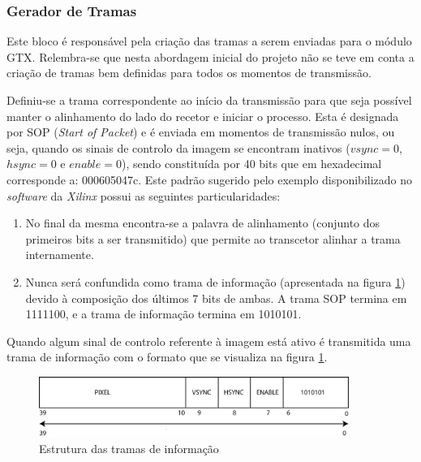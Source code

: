 \documentclass[11pt,a4paper]{article}
\begin{document}
	\subsubsection*{Gerador de Tramas} \label{subsub:serial_frameGenerator}
	
	Este bloco é responsável pela criação das tramas a serem enviadas para o módulo GTX. Relembra-se que nesta abordagem inicial do projeto não se teve em conta a criação de tramas bem definidas para todos os momentos de transmissão. 
	
	Definiu-se a trama correspondente ao início da transmissão para que seja possível manter o alinhamento do lado do recetor e iniciar o processo. Esta é designada por  SOP (\textit{Start of Packet}) e é enviada em momentos de transmissão nulos, ou seja, quando os sinais de controlo da imagem se encontram inativos ($vsync = 0$, $hsync = 0$ e $enable = 0$), sendo constituída por 40 bits que em hexadecimal corresponde a: 000605047c. Este padrão sugerido pelo exemplo disponibilizado no \textit{software} da \textit{Xilinx} possui as seguintes particularidades:
	
	\begin{enumerate}
		\item No final da mesma encontra-se a palavra de alinhamento (conjunto dos primeiros bits a ser transmitido) que permite ao transcetor alinhar a trama internamente.
		\item Nunca será confundida como trama de informação (apresentada na figura \ref{fig:trama_abordagem_inicial}) devido à composição dos últimos 7  bits de ambas. A trama SOP termina em 1111100, e a trama de informação termina em 1010101.
	\end{enumerate}
	
	
	
	Quando algum sinal de controlo referente à imagem está ativo é transmitida uma trama de informação com o formato que se visualiza na figura \ref{fig:trama_abordagem_inicial}.
	
	\begin{figure}[h!]
		\begin{center}
			\leavevmode
			\includegraphics[width=0.9\textwidth]{trama_abordagem_inicial}
			\caption[Estrutura das tramas de informação]{Estrutura das tramas de informação}
			\label{fig:trama_abordagem_inicial}
		\end{center}
	\end{figure}
	
\end{document}
